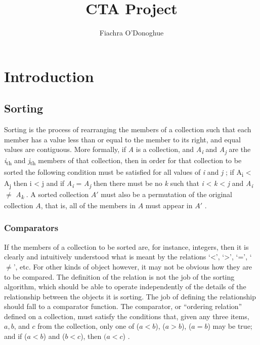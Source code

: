 \documentclass[12pt, a4paper]{article}
\title{CTA Project}
\author{Fiachra O'Donoghue}
\begin{document}
    
\section{Introduction}

\subsection{Sorting}

Sorting is the process of rearranging the members of a collection such that each member has a value less than or equal to the member to its right, and equal values are contiguous. More formally, if \emph{A} is a collection, and \emph{A\textsubscript{i}} and \emph{A\textsubscript{j}} are the \emph{i}\textsubscript{th}  and \emph{j}\textsubscript{th} members of that collection, then in order for that collection to be sorted the following condition must be satisfied for all values of \emph{i} and \emph{j}
; if A\textsubscript{i} < A\textsubscript{j} then i < j and if \emph{A\textsubscript{i}} = \emph{A\textsubscript{j}} then there must be no \emph{k} such that \emph{i} < \emph{k} < \emph{j} and \emph{A\textsubscript{i}} $\ne$ \emph{A\textsubscript{k}} \autocite[53]{heineman2016algorithms}. A sorted collection $A'$ must also be a permutation of the original collection $A$, that is, all of the members in $A$ must appear in $A'$ \autocite[15]{cormen01}.

\subsubsection{Comparators}

If the members of a collection to be sorted are, for instance, integers, then it is clearly and intuitively understood what is meant by the relations `<', `>', `=', `$\ne$', etc. For other kinds of object however, it may not be obvious how they are to be compared. The definition of the relation is not the job of the sorting algorithm, which should be able to operate independently of the details of the relationship between the objects it is sorting. The job of defining the relationship should fall to a comparator function. The comparator, or ``ordering relation'' defined on a collection, must satisfy the conditions that, given any three items, $a, b$, and $c$ from the collection, only one of ($a < b$), ($a > b$), ($a = b$) may be true; and if ($a < b$) and ($b < c$), then $(a < c$) \autocite[5]{knuth1968art}.
\end{document}
